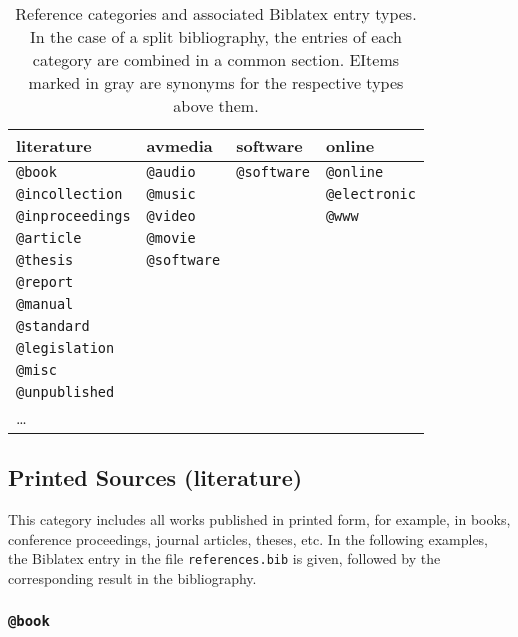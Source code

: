 \begin{table}
\caption{Reference categories and associated Biblatex entry types. In the case
of a split bibliography, the entries of each category are combined in a
common section. EItems marked in gray are synonyms for the respective
types above them.}
\label{tab:reference-categories}
\centering
{}
\setlength{\tabcolsep}{4mm}
\begin{tabular}{@{}llll@{}}
	\toprule
	\textsf{literature} & \textsf{avmedia} & \textsf{software} & \textsf{online} \\
	\midrule
	\texttt{@book} & \texttt{@audio} & \texttt{@software} & \texttt{@online} \\
	\texttt{@incollection} & \texttt{\color{midgray}@music} & & \texttt{\color{midgray}@electronic} \\
	\texttt{@inproceedings} & \texttt{@video} & & \texttt{\color{midgray}@www} \\
	\texttt{@article} & \texttt{@movie} & & \\
	\texttt{@thesis} & \texttt{@software} & & \\
	\texttt{@report} & & & \\
	\texttt{@manual} & & & \\
	\texttt{@standard} & & & \\
	\texttt{@legislation} & & & \\
	\texttt{@misc} & & &  \\
	\texttt{@unpublished} &  & & \\
	\ldots & & & \\
	\bottomrule
\end{tabular}
\end{table}


\subsection{Printed Sources (\textsf{literature})}
\label{sec:category-literature}

This category includes all works published in printed form, for example, in
books, conference proceedings, journal articles, theses, etc. In the following
examples, the Biblatex entry in the file \nolinkurl{references.bib} is given,
followed by the corresponding result in the bibliography.

\subsubsection{\texttt{\bfseries @book}}
\label{sec:@book}

